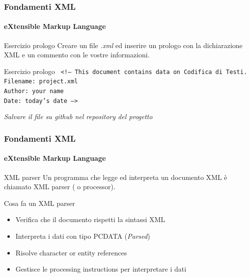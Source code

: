 \begin{frame}
	\frametitle{Fondamenti XML}
	\framesubtitle{eXtensible Markup Language}
	\addtocounter{nframe}{1}

	\begin{block}{Esercizio prologo}
		Creare un file \textit{.xml} ed inserire un prologo con la dichiarazione XML e un commento con le vostre informazioni.
	\end{block}

	\begin{block}{Esercizio prologo}
		\texttt{
		 <!--
		 	This document contains data on Codifica di Testi.
		 	\\Filename: project.xml
		 	\\Author: your name
		 	\\Date: today's date
		-->
		}
	\end{block}

	\begin{tiny}
		\textit{Salvare il file su github nel repository del progetto}
	\end{tiny}

\end{frame}

\begin{frame}
	\frametitle{Fondamenti XML}
	\framesubtitle{eXtensible Markup Language}
	\addtocounter{nframe}{1}

	\begin{block}{XML parser}
		Un programma che legge ed interpreta un documento XML è chiamato XML parser ( o processor).
	\end{block}
	\begin{block}{Cosa fa un XML parser}
		\begin{itemize}
			\item Verifica che il documento rispetti la sintassi XML
			\item Interpreta i dati con tipo PCDATA (\textit{Parsed})
			\item Risolve character or entity references
			\item Gestisce le processing instructions per interpretare i dati
		\end{itemize}
	\end{block}

\end{frame}

